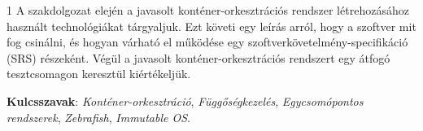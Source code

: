 \begin{spacing}{1}
A szakdolgozat elején a javasolt konténer-orkesztrációs rendszer létrehozásához használt technológiákat tárgyaljuk. Ezt követi egy leírás arról, hogy a szoftver mit fog csinálni, és hogyan várható el működése egy szoftverkövetelmény-specifikáció (SRS) részeként. Végül a javasolt konténer-orkesztrációs rendszert egy átfogó tesztcsomagon keresztül kiértékeljük.

\vskip 0.5cm

\textbf{Kulcsszavak}: \textit{Konténer-orkesztráció}, \textit{Függőségkezelés}, \textit{Egycsomópontos rendszerek}, \textit{Zebrafish}, \textit{Immutable OS}.
\end{spacing}
\vfill
{}

